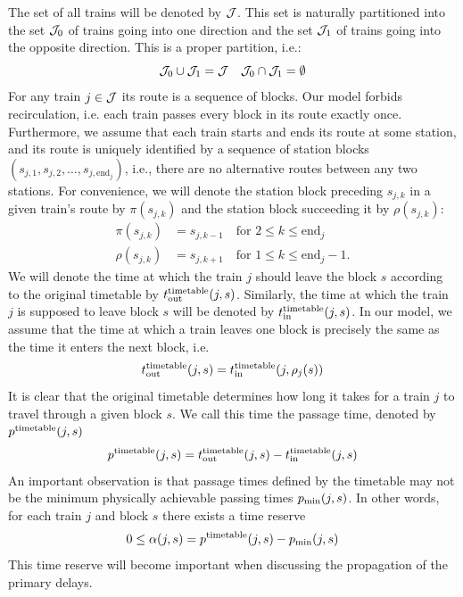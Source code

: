 The set of all trains will be denoted by $\mathcal{J}$. This set is naturally partitioned into
the set $\mathcal{J}_0$ of trains going into one direction and the set $\mathcal{J}_1$ of trains going
into the opposite direction. This is a proper partition, i.e.:
\begin{equation}
	\mathcal{J}_0 \cup \mathcal{J}_1 = \mathcal{J} \quad \mathcal{J}_0 \cap \mathcal{J}_1 = \emptyset
\end{equation}
For any train $j \in \mathcal{J}$ its route is a sequence of blocks. Our model forbids recirculation,
i.e. each train passes every block in its route exactly once. Furthermore, we assume that each train
starts and ends its route at some station, and its route is uniquely identified by a sequence of
station blocks $\left(s_{j,1}, s_{j, 2}, \ldots, s_{j, \text{end}_j}\right)$, i.e., there
are no alternative routes between any two stations. For convenience, we will denote the station
block preceding $s_{j,k}$ in a given train's route by $\pi(s_{j,k})$ and the station block succeeding
it by $\rho(s_{j,k})$:
\begin{align}
	\pi(s_{j,k})  & = s_{j,k-1} \quad \mbox{for } 2 \le k \le \mbox{end}_j      \\
	\rho(s_{j,k}) & = s_{j,k+1} \quad \mbox{for } 1 \le k \le \mbox{end}_j - 1.
\end{align}
We will denote the time at which the train $j$ should leave the block $s$ according to the original
timetable by $t_\text{out}^\text{timetable}(j, s)$. Similarly, the time at which the train $j$ is supposed to leave block $s$
will be denoted by $t_\text{in}^\text{timetable}(j, s)$. In our model, we assume that the time at which a train leaves one
block is precisely the same as the time it enters the next block, i.e.
\begin{equation}
	t_\text{out}^\text{timetable}(j, s) = t_\text{in}^\text{timetable}(j, \rho_j(s))
\end{equation}
It is clear that the original timetable determines how long it takes for a train $j$ to travel
through a given block $s$. We call this time the passage time, denoted by $p^\text{timetable}(j, s)$
\begin{equation}
	p^\text{timetable}(j, s) = t_\text{out}^\text{timetable}(j, s) - t_\text{in}^\text{timetable}(j, s)
\end{equation}
An important observation is that passage times defined by the timetable may not be the minimum physically
achievable passing times $p_\text{min}(j, s)$. In other words, for each train $j$ and block $s$ there
exists a time reserve
\begin{equation}
	\label{eq:pt}
	0 \le \alpha(j, s) = p^\text{timetable}(j, s) - p_\text{min}(j, s)
\end{equation}
This time reserve will become important when discussing the propagation of the primary delays.

